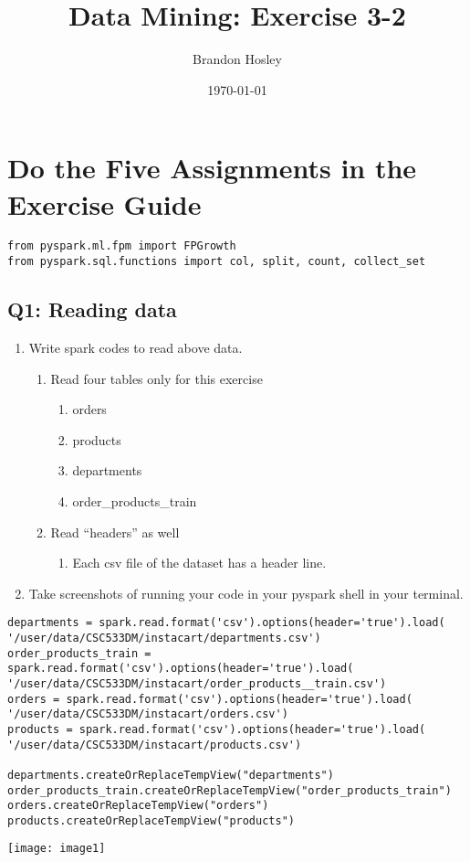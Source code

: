 \documentclass[]{article}
\title{Data Mining: Exercise 3-2}
\author{Brandon Hosley}
\date{\today}
\begin{document}
\maketitle

\section*{Do the Five Assignments in the Exercise Guide}

\begin{verbatim}
from pyspark.ml.fpm import FPGrowth
from pyspark.sql.functions import col, split, count, collect_set
\end{verbatim}

\subsection*{Q1: Reading data}
\begin{enumerate}[before=\itshape,label=\arabic*.]
	\item Write spark codes to read above data.
	\begin{enumerate}[before=\itshape,label=\alph*.]
		\item Read four tables only for this exercise
		\begin{enumerate}[before=\itshape,label=\roman*.]
			\item orders
			\item products
			\item departments
			\item order\_products\_train
		\end{enumerate}
		\item Read “headers” as well
		\begin{enumerate}[before=\itshape,label=\roman*.]
			\item Each csv file of the dataset has a header line.
		\end{enumerate}
	\end{enumerate}
	\item Take screenshots of running your code in your pyspark shell in your terminal.
\end{enumerate} 

\begin{verbatim}
departments = spark.read.format('csv').options(header='true').load( '/user/data/CSC533DM/instacart/departments.csv')
order_products_train = spark.read.format('csv').options(header='true').load( '/user/data/CSC533DM/instacart/order_products__train.csv')
orders = spark.read.format('csv').options(header='true').load( '/user/data/CSC533DM/instacart/orders.csv')
products = spark.read.format('csv').options(header='true').load( '/user/data/CSC533DM/instacart/products.csv')

departments.createOrReplaceTempView("departments")
order_products_train.createOrReplaceTempView("order_products_train")
orders.createOrReplaceTempView("orders")
products.createOrReplaceTempView("products")
\end{verbatim}
\texttt{[image: image1]}
\end{document}
